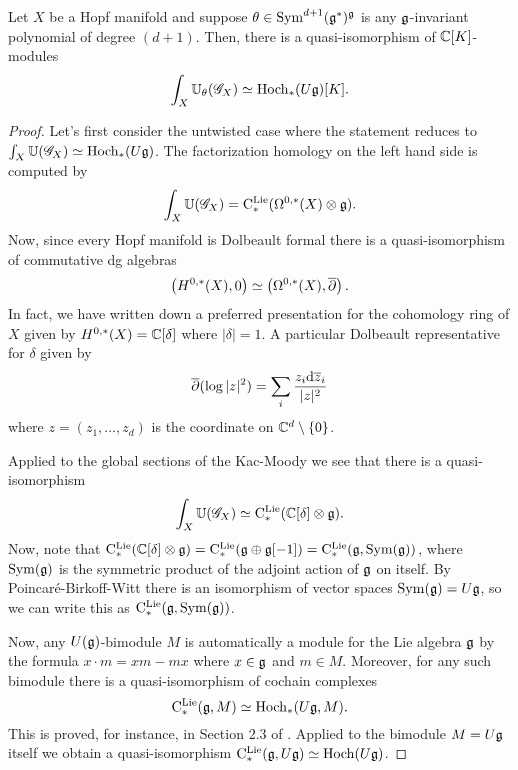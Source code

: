 \documentclass[10pt]{amsart}
\begin{document}
\begin{prop}
Let $X$ be a Hopf manifold and suppose $\theta \in {\rm Sym}^{d+1}(\mathfrak g^*)^\mathfrak g$ is any $\mathfrak g$-invariant polynomial of degree $(d+1)$. 
Then, there is a quasi-isomorphism of $\mathbb C[K]$-modules
\[
\int_X \mathbb U_\theta (\mathscr G_X) \simeq {\rm Hoch}_*(U \mathfrak g)[K] .
\]
\end{prop}
\begin{proof}
Let's first consider the untwisted case where the statement reduces to $\int_X \mathbb U (\mathscr G_X) \simeq {\rm Hoch}_*(U \mathfrak g)$.
The factorization homology on the left hand side is computed by
\[
\int_X \mathbb U(\mathscr G_X) = {\rm C}^{\rm Lie}_*(\Omega^{0,*}(X) \otimes \mathfrak g) .
\]
Now, since every Hopf manifold is Dolbeault formal there is a quasi-isomorphism of commutative dg algebras
\[
\left(H^{0,*}(X), 0\right) \simeq \left(\Omega^{0,*}(X), \overline{\partial}\right) .
\]
In fact, we have written down a preferred presentation for the cohomology ring of $X$ given by $H^{0,*}(X) = \mathbb C[\delta]$ where $|\delta| = 1$.
A particular Dolbeault representative for $\delta$ given by
\[
\overline{\partial} (\log |z|^2) = \sum_i \frac{z_i{\rm d} \overline{z}_i}{|z|^2}
\]
where $z = (z_1,\ldots,z_d)$ is the coordinate on $\mathbb C^d \setminus \{0\}$. 

Applied to the global sections of the Kac-Moody we see that there is a quasi-isomorphism
\[
\int_X \mathbb U(\mathscr G_X) \simeq {\rm C}^{\rm Lie}_*(\mathbb C[\delta] \otimes \mathfrak g) .
\]
Now, note that ${\rm C}^{\rm Lie}_*(\mathbb C[\delta] \otimes \mathfrak g) = {\rm C}^{\rm Lie}_*(\mathfrak g \oplus \mathfrak g[-1]) = {\rm C}^{\rm Lie}_*(\mathfrak g, {\rm Sym} (\mathfrak g))$, where ${\rm Sym}(\mathfrak g)$ is the symmetric product of the adjoint action of $\mathfrak g$ on itself. 
By Poincar\'{e}-Birkoff-Witt there is an isomorphism of vector spaces ${\rm Sym}(\mathfrak g) = U \mathfrak g$, so we can write this as ${\rm C}^{\rm Lie}_*(\mathfrak g, {\rm Sym} (\mathfrak g))$.

Now, any $U(\mathfrak g)$-bimodule $M$ is automatically a module for the Lie algebra $\mathfrak g$ by the formula $x \cdot m = xm - mx$ where $x \in \mathfrak g$ and $m \in M$.
Moreover, for any such bimodule there is a quasi-isomorphism of cochain complexes 
\[
{\rm C}^{\rm Lie}_*(\mathfrak g, M) \simeq {\rm Hoch}_*(U\mathfrak g, M) .
\]
This is proved, for instance, in Section 2.3 of \cite{lectETH}.
Applied to the bimodule $M = U\mathfrak g$ itself we obtain a quasi-isomorphism ${\rm C}^{\rm Lie}_*(\mathfrak g , U\mathfrak g) \simeq {\rm Hoch}(U\mathfrak g)$.


\end{proof}
\end{document}

